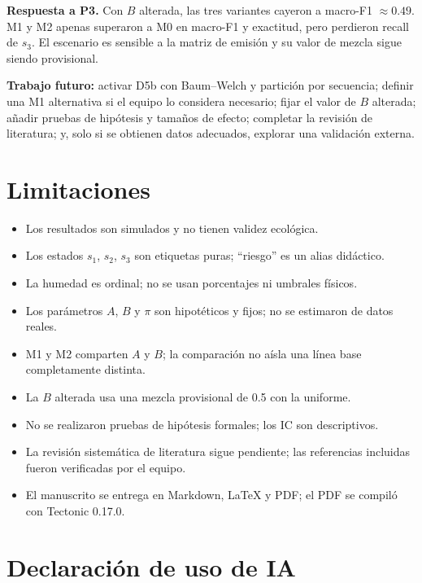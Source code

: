 \documentclass[11pt,a4paper]{article}
\begin{document}
\textbf{Respuesta a P3.} Con \(B\) alterada, las tres variantes cayeron a macro-F1 \(\approx 0.49\). M1 y M2 apenas superaron a M0 en macro-F1 y exactitud, pero perdieron recall de \(s_3\). El escenario es sensible a la matriz de emisión y su valor de mezcla sigue siendo provisional.

\textbf{Trabajo futuro:} activar D5b con Baum--Welch y partición por secuencia; definir una M1 alternativa si el equipo lo considera necesario; fijar el valor de \(B\) alterada; añadir pruebas de hipótesis y tamaños de efecto; completar la revisión de literatura; y, solo si se obtienen datos adecuados, explorar una validación externa.

\section{Limitaciones}

\begin{itemize}
  \item Los resultados son simulados y no tienen validez ecológica.
  \item Los estados \(s_1\), \(s_2\), \(s_3\) son etiquetas puras; ``riesgo'' es un alias didáctico.
  \item La humedad es ordinal; no se usan porcentajes ni umbrales físicos.
  \item Los parámetros \(A\), \(B\) y \(\pi\) son hipotéticos y fijos; no se estimaron de datos reales.
  \item M1 y M2 comparten \(A\) y \(B\); la comparación no aísla una línea base completamente distinta.
  \item La \(B\) alterada usa una mezcla provisional de 0.5 con la uniforme.
  \item No se realizaron pruebas de hipótesis formales; los IC son descriptivos.
  \item La revisión sistemática de literatura sigue pendiente; las referencias incluidas fueron verificadas por el equipo.
  \item El manuscrito se entrega en Markdown, LaTeX y PDF; el PDF se compiló con Tectonic 0.17.0.
\end{itemize}

\section{Declaración de uso de IA}
\end{document}
